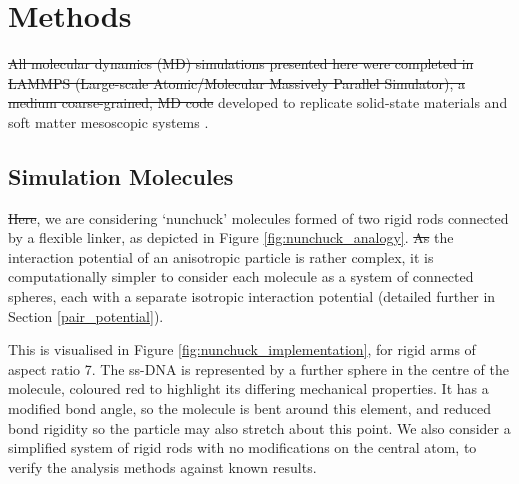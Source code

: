 \documentclass[11pt, a4paper]{article} %
\providecommand{\DIFadd}[1]{{\protect\color{blue}\uwave{#1}}} %
\providecommand{\DIFdel}[1]{{\protect\color{red}\sout{#1}}}                      %
\providecommand{\DIFaddbegin}{} %
\providecommand{\DIFaddend}{} %
\providecommand{\DIFdelbegin}{} %
\providecommand{\DIFdelend}{} %
\begin{document}
\section{Methods} \label{sec:Methods}
\DIFdelbegin \DIFdel{All molecular dynamics (MD) simulations presented here were completed in LAMMPS (Large-scale Atomic/Molecular Massively Parallel Simulator), a medium coarse-grained, MD code }\DIFdelend \DIFaddbegin \DIFadd{\textcolor{forestgreen}{All molecular dynamics (MD) simulations presented here were completed in LAMMPS (Large-scale Atomic/Molecular Massively Parallel Simulator), which is a medium coarse-grained, MD code} }\DIFaddend developed to replicate solid-state materials and soft matter mesoscopic systems \cite{Plimpton1995, LAMMPS}.



\subsection{Simulation Molecules} \label{sec:SimMolecules}
\DIFdelbegin \DIFdel{Here}\DIFdelend \DIFaddbegin \DIFadd{\textcolor{forestgreen}{Here}}\DIFaddend , we are considering `nunchuck' molecules formed of two rigid rods connected by a flexible linker, as depicted in Figure \ref{fig:nunchuck_analogy}. \DIFdelbegin \DIFdel{As }\DIFdelend \DIFaddbegin \DIFadd{\textcolor{forestgreen}{As} }\DIFaddend the interaction potential of an anisotropic particle is rather complex, it is computationally simpler to consider each molecule as a system of connected spheres, each with a separate isotropic interaction potential (detailed further in Section \ref{pair_potential}).

This is visualised in Figure \ref{fig:nunchuck_implementation}, for rigid arms of aspect ratio 7. The ss-DNA is represented by a further sphere in the centre of the molecule, coloured red to highlight its differing mechanical properties. It has a modified bond angle, so the molecule is bent around this element, and reduced bond rigidity so the particle may also stretch about this point. We also consider a simplified system of rigid rods with no modifications on the central atom, to verify the analysis methods against known results.
\end{document}
